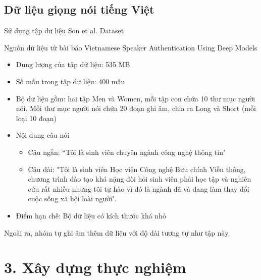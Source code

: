 \documentclass{article}
\begin{document}
	\subsection{Dữ liệu giọng nói tiếng Việt}
	Sử dụng tập dữ liệu Son et al. Dataset
	
	Nguồn dữ liệu từ bài báo Vietnamese Speaker Authentication Using Deep Models
	\begin{itemize}
		\item Dung lượng của tập dữ liệu: 535 MB
		\item Số mẫu trong tập dữ liệu: 400 mẫu
		\item Bộ dữ liệu gồm: hai tập  Men và Women, mỗi tập con chứa 10 thư mục người nói. Mỗi thư mục người nói chứa 20 đoạn ghi âm, chia ra Long và Short (mỗi loại 10 đoạn) 
		\item Nội dung câu nói
		\begin{itemize}
			\item Câu ngắn: “Tôi là sinh viên chuyên ngành công nghệ thông tin"
			\item Câu dài: "Tôi là sinh viên Học viện Công nghệ Bưu chính Viễn thông, chương trình đào tạo khá nặng đòi hỏi sinh viên phải học tập và nghiên cứu rất nhiều nhưng tôi tự hào vì đó là ngành đã và đang làm thay đổi cuộc sống xã hội loài người".
		\end{itemize}
		\item Điểm hạn chế: Bộ dữ liệu có kích thước khá nhỏ
	\end{itemize}
	
	Ngoài ra, nhóm tự ghi âm thêm dữ liệu với độ dài tương tự như tập này.
	
	\section{3. Xây dựng thực nghiệm}
\end{document}
